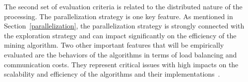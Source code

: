 The second set of evaluation criteria is related to the distributed nature of
the processing. 
The parallelization strategy is one key feature. As mentioned in Section~\ref{parallelization}, the parallelization strategy is strongly connected with the exploration strategy and can impact significantly on the efficiency of the mining algorithm. Two other important features that will be empirically evaluated are  
the behaviors of the algorithms in terms of load balancing and communication costs.
They represent critical issues with high impacts on the scalability and efficiency of the algorithms and their implementations~\cite{afrati2012designing,leskovec2014mining}.

